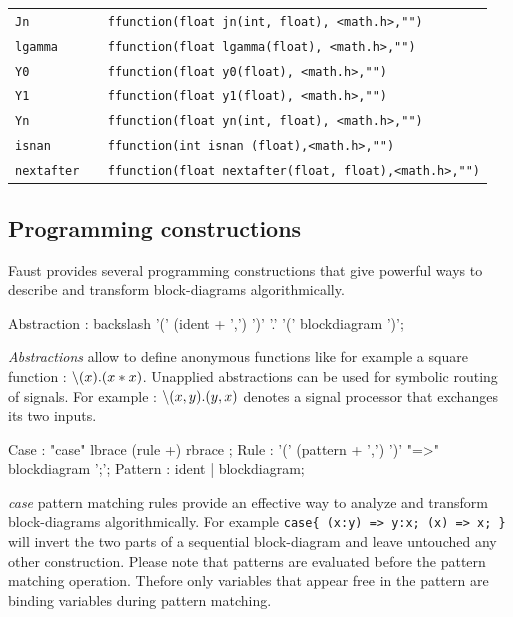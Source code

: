 \documentclass{article}
\begin{document}
\begin{tabular}{|l|l|}
\texttt{Jn			} & \texttt{ ffunction(float jn(int, float), <math.h>,"")} \\
\texttt{lgamma		} & \texttt{ ffunction(float lgamma(float), <math.h>,"")} \\
\texttt{Y0			} & \texttt{ ffunction(float y0(float), <math.h>,"")} \\
\texttt{Y1			} & \texttt{ ffunction(float y1(float), <math.h>,"")} \\
\texttt{Yn			} & \texttt{ ffunction(float yn(int, float), <math.h>,"")} \\
\texttt{isnan 		} & \texttt{ ffunction(int isnan (float),<math.h>,"")} \\
\texttt{nextafter	} & \texttt{ ffunction(float nextafter(float, float),<math.h>,"")} \\
\hline
\end{tabular}

\vspace{5 mm}

\subsection{Programming constructions}

Faust provides several programming constructions that give powerful ways to describe and transform block-diagrams algorithmically.

\begin{rail}
Abstraction :  backslash '(' (ident + ',') ')' '.' '(' blockdiagram ')';
\end{rail} 
\emph{Abstractions} allow to define anonymous functions like for example a square function : $\char"5C (x).(x*x)$. Unapplied abstractions can be used for symbolic routing of signals. For example : $\char"5C (x,y).(y,x)$ denotes a signal processor that exchanges its two inputs. 

\begin{rail}
Case :  "case" lbrace (rule +) rbrace ;
Rule : '(' (pattern + ',') ')' "=>" blockdiagram ';';
Pattern : ident | blockdiagram;
\end{rail}
\emph{case} pattern matching rules provide an effective way to analyze and transform block-diagrams algorithmically. For example \texttt{case\{ (x:y) => y:x; (x) => x; \}} will invert the two parts of a sequential block-diagram and leave untouched any other construction. Please note that patterns are evaluated before the pattern matching operation. Thefore only variables that appear free in the pattern are binding variables during pattern matching. 
\end{document}
